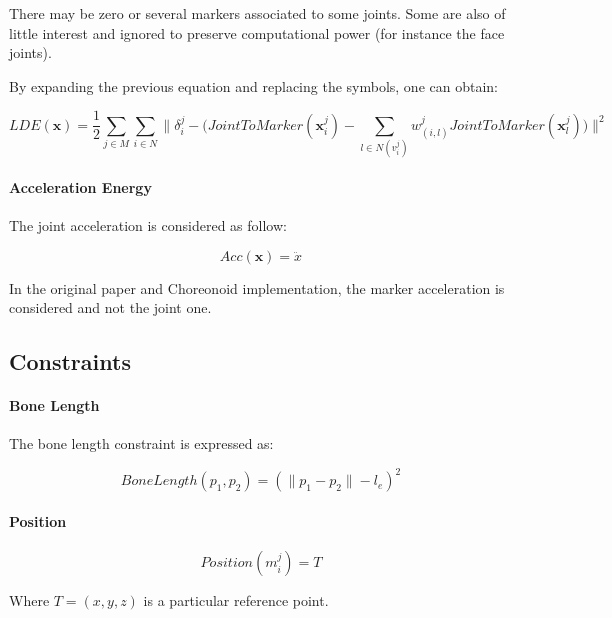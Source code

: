 \documentclass{article}
\begin{document}
\danger There may be zero or several markers associated to some
joints. Some are also of little interest and ignored to preserve
computational power (for instance the face joints).


By expanding the previous equation and replacing the symbols, one can
obtain:


\begin{equation}
  LDE(\mathbf{x}) = \frac{1}{2}  \sum_{j \in M} \sum_{i \in N} \big\| \delta_i^j - \big( JointToMarker(\mathbf{x}_i^j) - \sum_{l\in N(v_i^j)} w_{(i,l)}^j JointToMarker(\mathbf{x}_l^j) \big) \big\|^2
\end{equation}


\paragraph{Acceleration Energy}


The joint acceleration is considered as follow:


\begin{equation}
  {Acc}(\mathbf{x}) = \ddot{x}
\end{equation}


\danger In the original paper and Choreonoid implementation, the
marker acceleration is considered and not the joint one.


\subsection{Constraints}

\paragraph{Bone Length}

The bone length constraint is expressed as:

\begin{equation}
  BoneLength(p_1, p_2) = (\| p_1 - p_2 \| - l_e)^2
\end{equation}

\paragraph{Position}

\begin{equation}
  Position(m_i^j) = T
\end{equation}

Where $T = (x, y, z)$ is a particular reference point.
\end{document}

